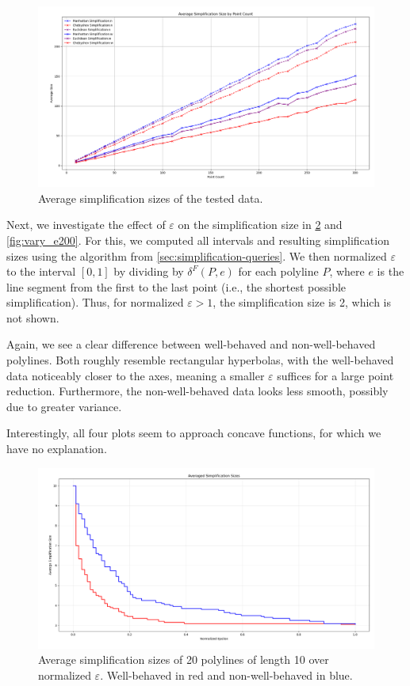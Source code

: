 \begin{figure}[b]
  \centering
	\includegraphics[scale=0.4]{./figures/simplification_sizes.png}
  \caption{Average simplification sizes of the tested data.}
  \label{fig:simplification_sizes}
\end{figure}

Next, we investigate the effect of \(\varepsilon\) on the simplification size in \cref{fig:vary_e10} and \cref{fig:vary_e200}. For this, we computed all intervals and resulting simplification sizes using the algorithm from \cref{sec:simplification-queries}. We then normalized \(\varepsilon\) to the interval \([0, 1]\) by dividing by \(\delta^F(P, e)\) for each polyline \(P\), where \(e\) is the line segment from the first to the last point (i.e., the shortest possible simplification). Thus, for normalized \(\varepsilon > 1\), the simplification size is 2, which is not shown.

Again, we see a clear difference between well-behaved and non-well-behaved polylines. Both roughly resemble rectangular hyperbolas, with the well-behaved data noticeably closer to the axes, meaning a smaller \(\varepsilon\) suffices for a large point reduction. Furthermore, the non-well-behaved data looks less smooth, possibly due to greater variance.

Interestingly, all four plots seem to approach concave functions, for which we have no explanation.

\begin{figure}[b]
  \centering
	\includegraphics[scale=0.4]{./figures/vary_e10.png}
  \caption{Average simplification sizes of 20 polylines of length 10 over normalized \(\varepsilon\). Well-behaved in red and non-well-behaved in blue.}
  \label{fig:vary_e10}
\end{figure}


